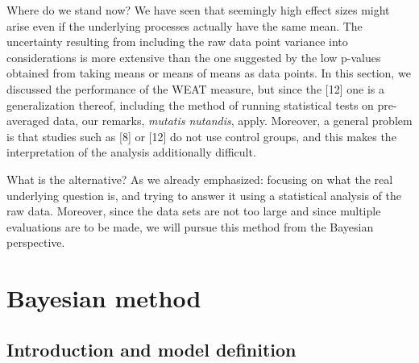 \documentclass[
  10pt,
  dvipsnames,enabledeprecatedfontcommands]{scrartcl}
\begin{document}
Where do we stand now? We have seen that seemingly high effect sizes
might arise even if the underlying processes actually have the same
mean. The uncertainty resulting from including the raw data point
variance into considerations is more extensive than the one suggested by
the low p-values obtained from taking means or means of means as data
points. In this section, we discussed the performance of the WEAT
measure, but since the {[}12{]} one is a generalization thereof,
including the method of running statistical tests on pre-averaged data,
our remarks, \emph{mutatis nutandis}, apply. Moreover, a general problem
is that studies such as {[}8{]} or {[}12{]} do not use control groups,
and this makes the interpretation of the analysis additionally
difficult.

What is the alternative? As we already emphasized: focusing on what the
real underlying question is, and trying to answer it using a statistical
analysis of the raw data. Moreover, since the data sets are not too
large and since multiple evaluations are to be made, we will pursue this
method from the Bayesian perspective.

\hypertarget{bayesian-method}{%
\section{Bayesian method}\label{bayesian-method}}

\hypertarget{introduction-and-model-definition}{%
\subsection{Introduction and model
definition}\label{introduction-and-model-definition}}
\end{document}
